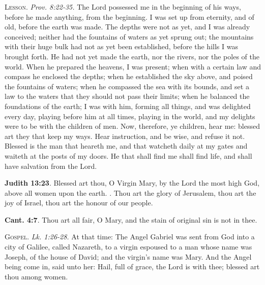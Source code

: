 \documentclass[11pt]{article} %
\begin{document}
\textsc{Lesson}. \textit{Prov. 8:22-35.} The Lord possessed me in the beginning
of his ways, before he made anything, from the beginning. I was set up from
eternity, and of old, before the earth was made. The depths were not as yet, and
I was already conceived; neither had the fountains of waters as yet sprung out;
the mountains with their huge bulk had not as yet been established, before the
hills I was brought forth. He had not yet made the earth, nor the rivers, nor
the poles of the world. When he prepared the heavens, I was present; when with a
certain law and compass he enclosed the depths; when he established the sky
above, and poised the fountains of waters; when he compassed the sea with its
bounds, and set a law to the waters that they should not pass their limits; when
he balanced the foundations of the earth; I was with him, forming all things,
and was delighted every day, playing before him at all times, playing in the
world, and my delights were to be with the children of men. Now, therefore, ye
children, hear me: blessed art they that keep my ways. Hear instruction, and be
wise, and refuse it not. Blessed is the man that heareth me, and that watcheth
daily at my gates and waiteth at the posts of my doors. He that shall find me
shall find life, and shall have salvation from the Lord.  

\vskip10pt


\textbf{Judith 13:23}. Blessed art thou, O Virgin Mary, by the Lord the most
high God, above all women upon the earth. \Vbar{}. Thou art the glory of
Jerusalem, thou art the joy of Israel, thou art the honour of our people.

\vskip10pt


\textbf{Cant. 4:7}. Thou art all fair, O Mary, and the stain of original sin is not in thee.


\vskip10pt
  
\textsc{Gospel}. \textit{Lk. 1:26-28.} At that time: The Angel Gabriel was sent
from God into a city of Galilee, called Nazareth, to a virgin espoused to a man
whose name was Joseph, of the house of David; and the virgin's name was Mary.
And the Angel being come in, said unto her: Hail, full of grace, the Lord is
with thee; blessed art thou among women.
\end{document}
